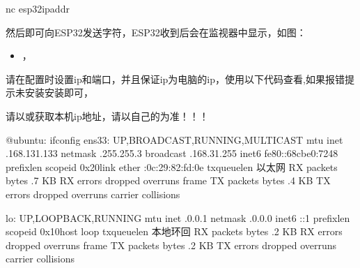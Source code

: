 \documentclass[a4paper,12pt,english]{sphinxmanual}
\begin{document}
{{\begin{sphinxVerbatim}[commandchars=\\\{\}]
nc esp32\PYGZhy{}ipaddr 
\end{sphinxVerbatim}

\sphinxAtStartPar
然后即可向ESP32发送字符，ESP32收到后会在监视器中显示，如图：

\sphinxAtStartPar
{}
\begin{itemize}
\item {} 
\sphinxAtStartPar
{}，

\end{itemize}

\sphinxAtStartPar
请在配置时设置ip和端口，并且保证ip为电脑的ip，使用以下代码查看,如果报错提示未安装安装即可，

\sphinxAtStartPar
请以或获取本机ip地址，请以自己的为准！！！

\begin{sphinxVerbatim}[commandchars=\\\{\}]
@ubuntu:\PYGZti{}\PYGZdl{} ifconfig
ens33: \PYGZlt{}UP,BROADCAST,RUNNING,MULTICAST\PYGZgt{}  mtu 
        inet .168.131.133  netmask .255.255.3  broadcast .168.31.255
        inet6 fe80::68cbe0:7248  prefixlen   scopeid 0x20\PYGZlt{}link\PYGZgt{}
        ether :0c:29:82:fd:0e  txqueuelen   以太网
        RX packets   bytes  .7 KB
        RX errors   dropped   overruns   frame 
        TX packets   bytes  .4 KB
        TX errors   dropped  overruns   carrier   collisions 

lo: \PYGZlt{}UP,LOOPBACK,RUNNING\PYGZgt{}  mtu 
        inet .0.0.1  netmask .0.0.0
        inet6 ::1  prefixlen   scopeid 0x10\PYGZlt{}host\PYGZgt{}
        loop  txqueuelen   本地环回
        RX packets   bytes  .2 KB
        RX errors   dropped   overruns   frame 
        TX packets   bytes  .2 KB
        TX errors   dropped  overruns   carrier   collisions 
\end{sphinxVerbatim}

}}
\end{document}
